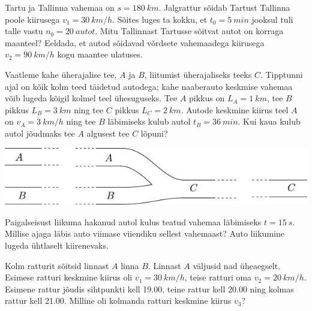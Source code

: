 \documentclass[10pt]{article}
\begin{document}
{%

Tartu ja Tallinna vahemaa on $s = \SI{180}{km}$. Jalgrattur sõidab Tartust Tallinna poole kiirusega $v_1 = \SI{30}{km/h}$. Sõites luges ta kokku, et $t_0 = \SI{5}{min}$ jooksul tuli talle vastu $n_0 = \SI{20}{autot}$. Mitu Tallinnast Tartusse sõitvat autot on korraga maanteel? Eeldada, et autod sõidavad võrdsete vahemaadega kiirusega $v_2 = \SI{90}{km/h}$ kogu maantee ulatuses.
\probend
\bigskip


Vaatleme kahe üherajalise tee, $A$ ja $B$, liitumist üherajaliseks teeks $C$. Tipptunni ajal on kõik kolm teed täidetud autodega; kahe naaberauto keskmise vahemaa võib lugeda kõigil kolmel teel ühesuguseks. Tee $A$ pikkus on $L_A = \SI{1}{km}$, tee $B$ pikkus $L_B = \SI{3}{km}$ ning tee $C$ pikkus $L_C = \SI{2}{km}$. Autode keskmine kiirus teel $A$ on $v_A = \SI{3}{km/h}$ ning tee $B$ läbimiseks kulub autol $t_B = \SI{36}{min}$. Kui kaua kulub autol jõudmaks tee $A$ algusest tee $C$ lõpuni?
\begin{center}
	\includegraphics[width=0.9\linewidth]{2007-v2g-02-yl}
\end{center}
\probend
\bigskip


Paigalseisust liikuma hakanud autol kulus teatud vahemaa läbimiseks $t = \SI{15}{s}$. Millise ajaga läbis auto viimase viiendiku sellest vahemaast? Auto liikumine lugeda ühtlaselt kiirenevaks.
\probend
\bigskip


Kolm ratturit sõitsid linnast $A$ linna $B$. Linnast $A$ väljusid nad üheaegselt. Esimese ratturi keskmine kiirus oli $v_1 = \SI{30}{km/h}$, teise ratturi oma $v_2 = \SI{20}{km/h}$. Esimene rattur jõudis sihtpunkti kell 19.00, teine rattur kell 20.00 ning kolmas rattur kell 21.00. Milline oli kolmanda ratturi keskmine kiirus $v_3$?
\probend
\bigskip

}
\end{document}
